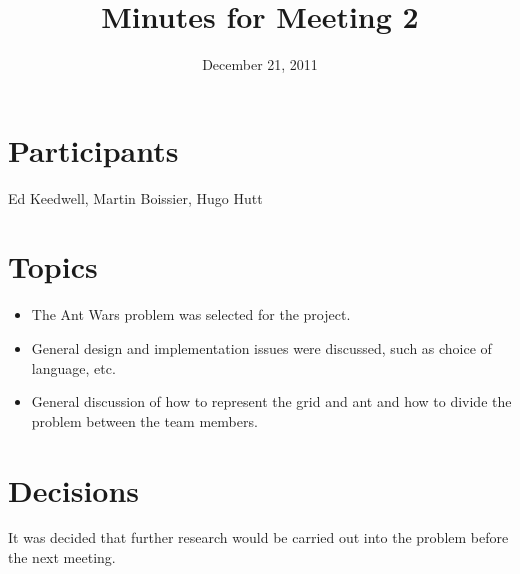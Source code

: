 \documentclass[a4paper, 11pt]{article}
\date{December 21, 2011}
\title{Minutes for Meeting 2}
\begin{document}
\maketitle

\section{Participants}

Ed Keedwell, Martin Boissier, Hugo Hutt

\section{Topics}

\begin{itemize}
\item The Ant Wars problem was selected for the project.
\item General design and implementation issues were discussed, such as
  choice of language, etc.
\item General discussion of how to represent the grid and ant and how
  to divide the problem between the team members.
\end{itemize}

\section{Decisions}

It was decided that further research would be carried out into
the problem before the next meeting.
\end{document}
